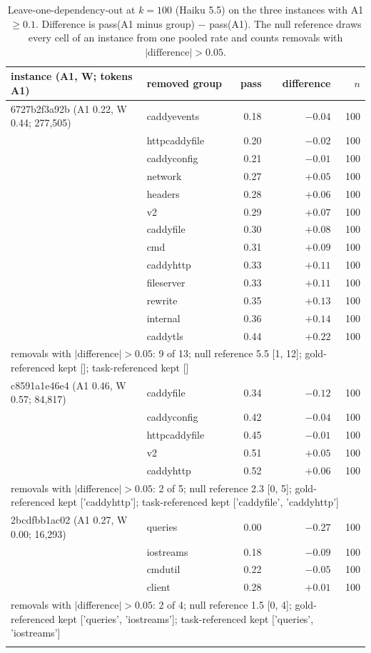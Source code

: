 \begin{table}[t]\centering\small
\caption{Leave-one-dependency-out at $k{=}100$ (Haiku 5.5) on the three instances with A1 $\geq 0.1$. Difference is pass(A1 minus group) $-$ pass(A1). The null reference draws every cell of an instance from one pooled rate and counts removals with $|\text{difference}| > 0.05$.}\label{tab:loo}
\begin{tabular}{llrrr}\toprule
instance (A1, W; tokens A1) & removed group & pass & difference & $n$\\\midrule
6727b2f3a92b (A1 0.22, W 0.44; 277,505) & caddyevents & 0.18 & $-0.04$ & 100\\
 & httpcaddyfile & 0.20 & $-0.02$ & 100\\
 & caddyconfig & 0.21 & $-0.01$ & 100\\
 & network & 0.27 & $+0.05$ & 100\\
 & headers & 0.28 & $+0.06$ & 100\\
 & v2 & 0.29 & $+0.07$ & 100\\
 & caddyfile & 0.30 & $+0.08$ & 100\\
 & cmd & 0.31 & $+0.09$ & 100\\
 & caddyhttp & 0.33 & $+0.11$ & 100\\
 & fileserver & 0.33 & $+0.11$ & 100\\
 & rewrite & 0.35 & $+0.13$ & 100\\
 & internal & 0.36 & $+0.14$ & 100\\
 & caddytls & 0.44 & $+0.22$ & 100\\
\multicolumn{5}{l}{\quad removals with $|$difference$|>0.05$: 9 of 13; null reference 5.5 [1, 12]; gold-referenced kept []; task-referenced kept []}\\\addlinespace
c8591a1e46e4 (A1 0.46, W 0.57; 84,817) & caddyfile & 0.34 & $-0.12$ & 100\\
 & caddyconfig & 0.42 & $-0.04$ & 100\\
 & httpcaddyfile & 0.45 & $-0.01$ & 100\\
 & v2 & 0.51 & $+0.05$ & 100\\
 & caddyhttp & 0.52 & $+0.06$ & 100\\
\multicolumn{5}{l}{\quad removals with $|$difference$|>0.05$: 2 of 5; null reference 2.3 [0, 5]; gold-referenced kept ['caddyhttp']; task-referenced kept ['caddyfile', 'caddyhttp']}\\\addlinespace
2bcdfbb1ac02 (A1 0.27, W 0.00; 16,293) & queries & 0.00 & $-0.27$ & 100\\
 & iostreams & 0.18 & $-0.09$ & 100\\
 & cmdutil & 0.22 & $-0.05$ & 100\\
 & client & 0.28 & $+0.01$ & 100\\
\multicolumn{5}{l}{\quad removals with $|$difference$|>0.05$: 2 of 4; null reference 1.5 [0, 4]; gold-referenced kept ['queries', 'iostreams']; task-referenced kept ['queries', 'iostreams']}\\\addlinespace
\bottomrule\end{tabular}\end{table}

